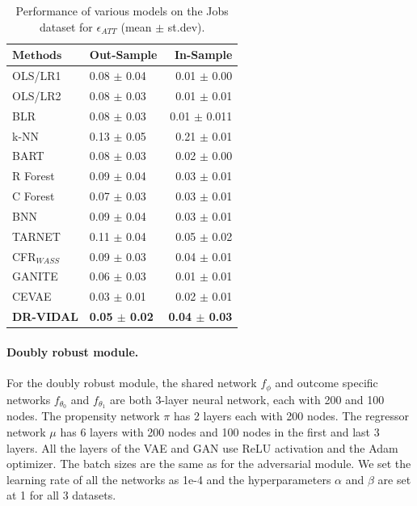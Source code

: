 \documentclass{amia}
\begin{document}
\begin{table} [h]
\fontsize{7.6pt}{0.35cm}\selectfont
\centering
\begin{tabular}{l|l r}
\toprule 
      $\boldsymbol{Methods}$ & Out-Sample & In-Sample \\
\midrule 
      OLS/LR1   & 0.08 $\pm$ 0.04  & 0.01 $\pm$ 0.00  \\
      OLS/LR2   & 0.08 $\pm$ 0.03 & 0.01 $\pm$ 0.01   \\
      BLR       & 0.08 $\pm$ 0.03 & 0.01 $\pm$ 0.011  \\
      k-NN      & 0.13 $\pm$ 0.05 & 0.21 $\pm$ 0.01   \\
\midrule 
      BART      & 0.08 $\pm$ 0.03 & 0.02 $\pm$ 0.00 \\
      R Forest  & 0.09 $\pm$ 0.04 & 0.03 $\pm$ 0.01 \\
      C Forest  & 0.07 $\pm$ 0.03 & 0.03 $\pm$ 0.01 \\
\midrule 
      BNN      & 0.09 $\pm$ 0.04 & 0.03 $\pm$ 0.01 \\
      TARNET    & 0.11 $\pm$ 0.04 & 0.05 $\pm$ 0.02 \\
      CFR$_{WASS}$ & 0.09 $\pm$ 0.03 & 0.04 $\pm$ 0.01 \\
\midrule 
      GANITE   & 0.06 $\pm$ 0.03 & 0.01 $\pm$ 0.01 \\
      CEVAE    &0.03 $\pm$ 0.01 & 0.02 $\pm$ 0.01 \\
\midrule
      \textbf{DR-VIDAL}  & \textbf{0.05 $\pm$ 0.02} & \textbf{0.04 $\pm$ 0.03}  \\
\bottomrule
\end{tabular}
\caption{Performance of 
various models on the Jobs dataset for $\epsilon_{ATT}$ (mean $\pm$ st.dev).}\smallskip
\label{tab: Jobs_within}
\end{table}


\paragraph{Doubly robust module.} For the doubly robust module, the shared network $f_\phi$ and outcome specific networks $f_{\theta_0}$ and $f_{\theta_1}$ are both 3-layer neural network, each with 200 and 100 nodes. The propensity network $\pi$ has 2 layers each with 200 nodes. The regressor network $\mu$ has 6 layers with 200 nodes and 100 nodes in the first and last 3 layers. All the layers of the VAE and GAN use ReLU activation and the Adam optimizer. The batch sizes are the same as for the adversarial module. We set the learning rate of all the networks as 1e-4 and the hyperparameters $\alpha$ and $\beta$ are set at 1 for all 3 datasets.
\end{document}
